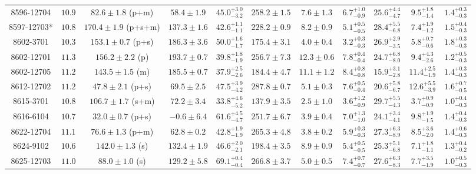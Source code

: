 \begin{landscape}
\begin{longtable}{ccccccccccc}
8596-12704 & $10.9$  & $82.6 \pm 1.8$ (p+m)  & $58.4 \pm 1.9$ & $45.0^{+3.0}_{-3.2}$  & $258.2 \pm 1.5 $ & $7.6 \pm 1.3 $ & $6.7^{+1.0}_{-0.9}$  & $25.6^{+4.4}_{-4.7}$  & $9.5^{+1.8}_{-1.4}$  & $1.4^{+0.3}_{-0.3}$ \\ 
8597-12703* & $10.8$  & $170.4 \pm 1.9$ (p+s+m)  & $137.3 \pm 1.6$ & $42.6^{+1.1}_{-1.1}$  & $228.2 \pm 0.9 $ & $8.2 \pm 0.9 $ & $5.1^{+0.5}_{-0.5}$  & $28.4^{+5.5}_{-6.8}$  & $7.4^{+1.9}_{-1.2}$  & $1.5^{+0.4}_{-0.3}$ \\ 
8602-3701 & $10.3$  & $153.1 \pm 0.7$ (p+s)  & $186.3 \pm 3.6$ & $50.0^{+1.6}_{-1.7}$  & $175.4 \pm 3.1 $ & $4.0 \pm 0.4 $ & $3.2^{+0.3}_{-0.3}$  & $26.9^{+2.9}_{-3.5}$  & $5.8^{+0.7}_{-0.6}$  & $1.8^{+0.3}_{-0.3}$ \\ 
8602-12701 & $11.3$  & $156.2 \pm 2.2$ (p)  & $193.7 \pm 0.7$ & $39.8^{+1.8}_{-1.9}$  & $256.7 \pm 7.3 $ & $12.3 \pm 0.6 $ & $7.8^{+0.4}_{-0.4}$  & $24.7^{+6.8}_{-8.0}$  & $9.4^{+4.3}_{-2.6}$  & $1.2^{+0.5}_{-0.3}$ \\ 
8602-12705 & $11.2$  & $143.5 \pm 1.5$ (m)  & $185.5 \pm 0.7$ & $37.9^{+2.5}_{-2.6}$  & $184.4 \pm 4.7 $ & $11.1 \pm 1.2 $ & $8.4^{+0.8}_{-0.8}$  & $15.9^{+3.1}_{-2.8}$  & $11.4^{+2.5}_{-1.9}$  & $1.4^{+0.3}_{-0.3}$ \\ 
8612-12702 & $11.2$  & $47.8 \pm 2.1$ (p+s)  & $69.5 \pm 2.5$ & $47.5^{+3.9}_{-4.2}$  & $287.8 \pm 0.7 $ & $5.1 \pm 0.3 $ & $7.6^{+0.5}_{-0.4}$  & $20.6^{+5.8}_{-6.7}$  & $12.6^{+5.5}_{-3.9}$  & $1.6^{+0.7}_{-0.5}$ \\ 
8615-3701 & $10.8$  & $106.7 \pm 1.7$ (s+m)  & $72.2 \pm 3.4$ & $33.8^{+4.6}_{-5.2}$  & $137.9 \pm 3.5 $ & $2.5 \pm 1.0 $ & $3.6^{+1.2}_{-0.9}$  & $29.7^{+5.5}_{-4.3}$  & $3.7^{+0.9}_{-0.9}$  & $1.0^{+0.4}_{-0.3}$ \\ 
8616-6104 & $10.7$  & $32.0 \pm 0.7$ (p+s)  & $-0.6 \pm 6.4$ & $61.6^{+4.5}_{-4.7}$  & $251.7 \pm 6.7 $ & $3.9 \pm 0.4 $ & $7.0^{+1.3}_{-1.0}$  & $24.1^{+3.4}_{-4.1}$  & $9.8^{+1.9}_{-1.5}$  & $1.4^{+0.4}_{-0.3}$ \\ 
8622-12704 & $11.1$  & $76.6 \pm 1.3$ (p+m)  & $62.8 \pm 0.2$ & $42.8^{+1.9}_{-1.9}$  & $265.3 \pm 4.8 $ & $3.8 \pm 0.2 $ & $5.9^{+0.3}_{-0.3}$  & $27.3^{+6.3}_{-8.9}$  & $8.5^{+3.6}_{-2.0}$  & $1.4^{+0.6}_{-0.3}$ \\ 
8624-9102 & $10.6$  & $142.0 \pm 1.3$ (s)  & $132.4 \pm 1.9$ & $46.6^{+2.0}_{-2.1}$  & $198.4 \pm 3.5 $ & $8.9 \pm 0.9 $ & $5.4^{+0.5}_{-0.5}$  & $25.3^{+5.1}_{-6.8}$  & $7.1^{+1.8}_{-1.1}$  & $1.3^{+0.4}_{-0.2}$ \\ 
8625-12703 & $11.0$  & $88.0 \pm 1.0$ (s)  & $129.2 \pm 5.8$ & $69.1^{+0.4}_{-0.4}$  & $266.8 \pm 3.7 $ & $5.0 \pm 0.5 $ & $7.4^{+0.7}_{-0.7}$  & $27.6^{+6.3}_{-8.3}$  & $7.7^{+3.5}_{-1.9}$  & $1.0^{+0.5}_{-0.3}$ \\ 

\end{longtable}
\end{landscape}
